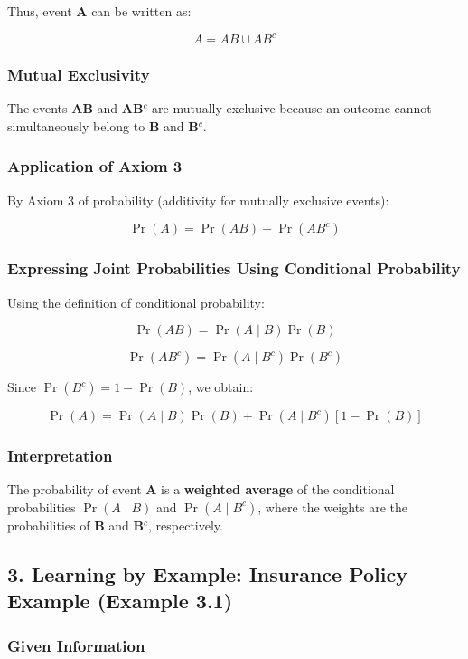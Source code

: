 \documentclass[12pt]{article}
\begin{document}
Thus, event \textbf{A} can be written as:

\[
A = AB \cup AB^{c}
\]

\subsubsection*{Mutual Exclusivity}

The events \textbf{AB} and \textbf{AB}$^{c}$ are mutually exclusive because an outcome cannot simultaneously belong to \textbf{B} and \textbf{B}$^{c}$.

\subsubsection*{Application of Axiom 3}

By Axiom 3 of probability (additivity for mutually exclusive events):

\[
\Pr(A) = \Pr(AB) + \Pr(AB^{c})
\]

\subsubsection*{Expressing Joint Probabilities Using Conditional Probability}

Using the definition of conditional probability:

\[
\Pr(AB) = \Pr(A \mid B)\Pr(B)
\]

\[
\Pr(AB^{c}) = \Pr(A \mid B^{c})\Pr(B^{c})
\]

Since $\Pr(B^{c}) = 1 - \Pr(B)$, we obtain:

\[
\Pr(A) = \Pr(A \mid B)\Pr(B) + \Pr(A \mid B^{c})[1 - \Pr(B)]
\]

\subsubsection*{Interpretation}

The probability of event \textbf{A} is a \textbf{weighted average} of the conditional probabilities $\Pr(A \mid B)$ and $\Pr(A \mid B^{c})$, where the weights are the probabilities of \textbf{B} and \textbf{B}$^{c}$, respectively.

\hrulefill

\subsection*{3. Learning by Example: Insurance Policy Example (Example 3.1)}

\subsubsection*{Given Information}
\end{document}
